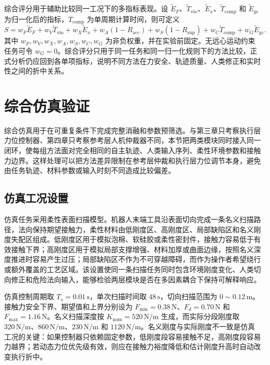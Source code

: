 综合评分用于辅助比较同一工况下的多指标表现。设 $\tilde E_F$、$\tilde T_{\mathrm{vio}}$、$\tilde E_x$、$\tilde T_{\mathrm{comp}}$ 和 $\tilde E_{\mathrm{gc}}$ 为归一化后的指标，$T_{\mathrm{comp}}$ 为单周期计算时间，则可定义
\begin{equation}
  S=
  w_F\tilde E_F+
  w_V\tilde T_{\mathrm{vio}}+
  w_X\tilde E_x+
  w_A(1-R_{\mathrm{acc}})+
  w_S(1-R_{\mathrm{sup}})+
  w_C\tilde T_{\mathrm{comp}}+
  w_G\tilde E_{\mathrm{gc}}.
  \label{eq:ch5_metric_score}
\end{equation}
其中 $w_F,w_V,w_X,w_A,w_S,w_C,w_G$ 为非负权重，并在实验前固定。无远心运动约束任务可令 $w_G=0$。综合评分只用于同一任务和同一归一化规则下的方法比较，正式分析仍应回到各单项指标，说明不同方法在力安全、轨迹质量、人类修正和实时性之间的折中关系。

\section{综合仿真验证}
\label{sec:ch5_integrated_simulation}

综合仿真用于在可重复条件下完成完整消融和参数预筛选。与第三章只考察执行层力位控制器、第四章只考察参考层人机仲裁器不同，本节把两类模块同时接入同一闭环，使每组方法面对完全相同的自主轨迹、人类输入序列、柔性环境参数和接触力边界。这样处理可以把方法差异限制在参考层仲裁和执行层力位调节本身，避免由任务轨迹、材料参数或输入时刻不同造成比较偏差。

\subsection{仿真工况设置}
\label{subsec:ch5_simulation_task_setting}

仿真任务采用柔性表面扫描模型。机器人末端工具沿表面切向完成一条名义扫描路径，法向保持期望接触力，柔性材料由低刚度区、高刚度区、局部缺陷区和名义刚度失配区组成。低刚度区用于模拟泡棉、软硅胶或柔性密封件，接触力容易低于有效接触下界；高刚度区用于模拟局部支撑增强、材料加厚或曲面边缘，按照名义深度推进时容易产生过压；局部缺陷区不作为不可穿越障碍，而作为操作者希望绕行或额外覆盖的工艺区域。该设置使同一条扫描任务同时包含环境刚度变化、人类切向修正和危险法向输入，能够检验两层模块是否在多因素耦合下保持可解释响应。

仿真控制周期取 $T_s=0.01\,\mathrm{s}$，单次扫描时间取 $48\,\mathrm{s}$，切向扫描范围为 $0\sim0.12\,\mathrm{m}$。接触力安全下界、期望值和上界分别设为 $F_{\min}=0.38\,\mathrm{N}$、$F_d=0.70\,\mathrm{N}$ 和 $F_{\max}=1.16\,\mathrm{N}$。名义扫描深度按 $K_{\mathrm{nom}}=520\,\mathrm{N/m}$ 生成，而实际分段刚度取 $320\,\mathrm{N/m}$、$860\,\mathrm{N/m}$、$230\,\mathrm{N/m}$ 和 $1120\,\mathrm{N/m}$。名义刚度与实际刚度不一致是仿真工况的关键：如果控制器只依赖固定参数，低刚度段容易接触不足，高刚度段容易力越界；若动态力位优先级有效，则应在接触力裕度降低和估计刚度升高时自动改变执行折中。

